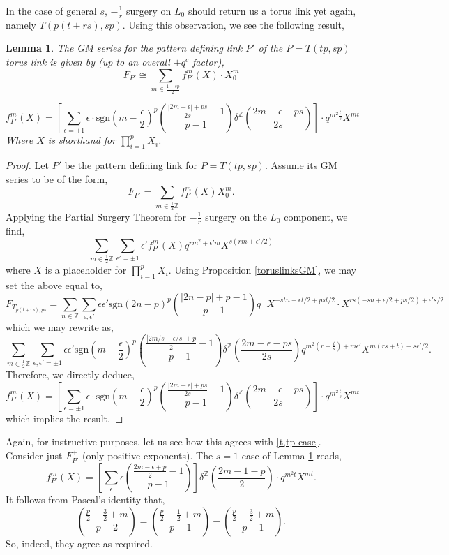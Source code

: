 \documentclass{article}
\newcommand{\Z}{{\mathbb Z}}
\newtheorem{lemma}[theorem]{Lemma}
\numberwithin{corollary}{theorem}
\numberwithin{corollary}{proposition}
\begin{document}
In the case of general $s$, $-\frac{1}{r}$ surgery on $L_0$ should return us a torus link yet again, namely $T(p(t+rs), sp)$. Using this observation, we see the following result,
\begin{lemma} \label{patterndefiningtoruslink}
    The GM series for the pattern defining link $P'$ of the $P = T(tp,sp)$ torus link is given by (up to an overall $\pm q^c$ factor),
    $$F_{P'} \cong \sum_{m\in \frac{1+sp}{2}} f^m_{P'}(X) \cdot X^m_0$$
    
    $$f^m_{P'}(X) = \left[ \sum_{\epsilon=\pm1} \epsilon \cdot \mathrm{sgn}(m-\frac{\epsilon}{2})^p\binom{\frac{|2m -\epsilon|+ps}{2s}-1}{p-1} \delta^\mathbb{Z}\left( \frac{2m-\epsilon-ps}{2s}\right)\right] \cdot q^{m^2 \frac{t}{s} }X^{mt}$$
    Where $X$ is shorthand for $\prod^p_{i=1}X_i$.
\end{lemma}
\begin{proof}
    Let $P'$ be the pattern defining link for $P=T(tp,sp)$. Assume its GM series to be of the form,
$$F_{P'} = \sum_{m\in \frac{1}{2}\Z} f^m_{P'}(X) X^m_0.$$
Applying the Partial Surgery Theorem for $-\frac{1}{r}$ surgery on the $L_0$ component, we find,
$$\sum_{m \in \frac{1}{2} \Z}\sum_{\epsilon' =\pm 1} \epsilon' f^m_{P'}(X) q^{rm^2 +\epsilon' m} X^{s(rm+\epsilon'/2)}$$
where $X$ is a placeholder for $\prod^p_{i=1}X_i$. Using Proposition \ref{toruslinksGM}, we may set the above equal to,
$$F_{T_{p(t+ rs),ps}} = \sum_{n\in \mathbb{Z}}\sum_{\epsilon,\epsilon'} \epsilon \epsilon ' \mathrm{sgn}(2n-p)^p\binom{|2n-p|+p-1}{p-1} q^{\cdots} X^{-stn +\epsilon t/2  +pst/2}\cdot  X^{rs(-sn+\epsilon/2 +ps/2)+ \epsilon's/2  } $$
which we may rewrite as,
$$\sum_{m \in \frac{1}{2}\Z}\sum_{\epsilon,\epsilon'=\pm1} \epsilon \epsilon ' \mathrm{sgn}(m-\frac{\epsilon}{2} )^p\binom{\frac{|2m/s -\epsilon/s|+p}{2}-1}{p-1} \delta^\mathbb{Z}\left( \frac{2m-\epsilon-ps}{2s}\right)q^{m^2 (r+\frac{t}{s})+m\epsilon'} X^{m (rs + t)+ s\epsilon'/2}.$$
Therefore, we directly deduce,
$$f^m_{P'}(X) = \left[ \sum_{\epsilon=\pm 1} \epsilon \cdot \mathrm{sgn}(m-\frac{\epsilon}{2} )^p \binom{\frac{|2m -\epsilon|+ps}{2s}-1}{p-1} \delta^\mathbb{Z}\left( \frac{2m-\epsilon-ps}{2s}\right)\right] \cdot q^{m^2 \frac{t}{s} }X^{mt}  $$
which implies the result.
\end{proof}

Again, for instructive purposes, let us see how this agrees with \eqref{t,tp case}. Consider just $F^+_{P'}$ (only positive exponents). The $s=1$ case of Lemma \ref{patterndefiningtoruslink} reads,
$$f^m_{P'}(X) = \left[ \sum_\epsilon \epsilon \binom{\frac{2m -\epsilon+p}{2}-1}{p-1} \right]\delta^\mathbb{Z}\left( \frac{2m-1-p}{2}\right) \cdot q^{m^2 t }X^{mt}.$$
It follows from Pascal's identity that,
$$\binom{\frac{p}{2}-\frac{3}{2}+m}{p-2} = \binom{\frac{p}{2}-\frac{1}{2}+m}{p-1}-\binom{\frac{p}{2}-\frac{3}{2}+m}{p-1}.$$
So, indeed, they agree as required.
\end{document}
